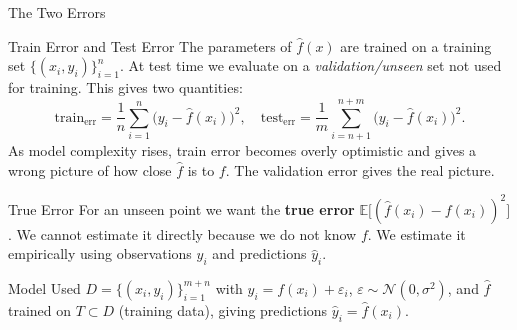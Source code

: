 \documentclass{beamer}
\begin{document}
\begin{frame}[shrink=10]{The Two Errors}
  \begin{block}{Train Error and Test Error}
    The parameters of $\hat f(x)$ are trained on a training set
    $\{(x_i,y_i)\}_{i=1}^{n}$. At test time we evaluate on a
    \emph{validation/unseen} set not used for training. This gives two
    quantities:
    \[
      \text{train}_{\text{err}} = \frac{1}{n}\sum_{i=1}^{n}\bigl(y_i - \hat f(x_i)\bigr)^2,
      \quad
      \text{test}_{\text{err}} = \frac{1}{m}\sum_{i=n+1}^{n+m}\bigl(y_i - \hat f(x_i)\bigr)^2.
    \]
    As model complexity rises, train error becomes overly optimistic and
    gives a wrong picture of how close $\hat f$ is to $f$. The validation
    error gives the real picture.
  \end{block}

  \begin{block}{True Error}
    For an unseen point we want the \textbf{true error}
    $\mathbb{E}\bigl[(\hat f(x_i) - f(x_i))^2\bigr]$. We cannot estimate it
    directly because we do not know $f$. We estimate it empirically using
    observations $y_i$ and predictions $\hat y_i$.
  \end{block}

  \begin{alertblock}{Model Used}
    $D = \{(x_i,y_i)\}_{i=1}^{m+n}$ with $y_i = f(x_i) + \varepsilon_i$,
    $\varepsilon \sim \mathcal N(0,\sigma^2)$, and $\hat f$ trained on
    $T \subset D$ (training data), giving predictions $\hat y_i = \hat f(x_i)$.
  \end{alertblock}
\end{frame}
\end{document}
